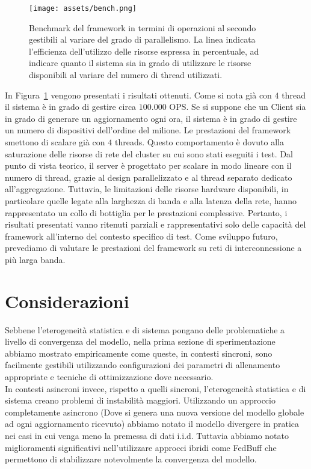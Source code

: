 \documentclass[a4paper, oneside, openright]{report}
\let\oldsection\section
\renewcommand{\section}{\newpage\oldsection}
\begin{document}
\begin{figure}[h!]
\centering
\texttt{[image: assets/bench.png]}
\caption{Benchmark del framework in termini di operazioni al secondo gestibili al variare del grado di parallelismo. La linea indicata l'efficienza dell'utilizzo delle risorse espressa in percentuale, ad indicare quanto il sistema sia in grado di utilizzare le risorse disponibili al variare del numero di thread utilizzati.}\label{fig:bench}
\end{figure}


In Figura~\ref{fig:bench} vengono presentati i risultati ottenuti. Come si nota già con $4$ thread il sistema è in grado di gestire circa $100.000$ OPS. Se si suppone che un Client sia in grado di generare un aggiornamento ogni ora, il sistema è in grado di gestire un numero di dispositivi dell'ordine del milione. 
Le prestazioni del framework smettono di scalare già con $4$ threads. Questo comportamento è dovuto alla saturazione delle risorse di rete del cluster su cui sono stati eseguiti i test. Dal punto di vista teorico, il server è progettato per scalare in modo lineare con il numero di thread, grazie al design parallelizzato e al thread separato dedicato all'aggregazione. Tuttavia, le limitazioni delle risorse hardware disponibili, in particolare quelle legate alla larghezza di banda e alla latenza della rete, hanno rappresentato un collo di bottiglia per le prestazioni complessive.
Pertanto, i risultati presentati vanno ritenuti parziali e rappresentativi solo delle capacità del framework all'interno del contesto specifico di test. Come sviluppo futuro, prevediamo di valutare le prestazioni del framework su reti di interconnessione a più larga banda.






 \section{Considerazioni}
Sebbene l'eterogeneità statistica e di sistema pongano delle problematiche a livello di convergenza del modello, nella prima sezione di sperimentazione abbiamo mostrato empiricamente come queste, in contesti sincroni, sono facilmente gestibili utilizzando configurazioni dei parametri di allenamento appropriate e tecniche di ottimizzazione dove necessario. \\

In contesti asincroni invece, rispetto a quelli sincroni, l'eterogeneità statistica e di sistema creano problemi di instabilità maggiori. Utilizzando un approccio completamente asincrono (Dove si genera una nuova versione del modello globale ad ogni aggiornamento ricevuto) abbiamo notato il modello divergere in pratica nei casi in cui venga meno la premessa di dati i.i.d. Tuttavia abbiamo notato miglioramenti significativi nell'utilizzare approcci ibridi come FedBuff \cite{DBLP:journals/corr/abs-2106-06639} che permettono di stabilizzare notevolmente la convergenza del modello. 
\end{document}
